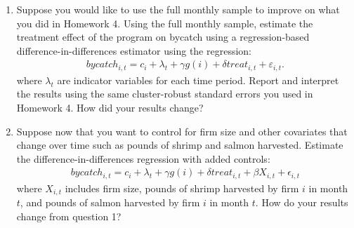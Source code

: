 \documentclass{article}
\begin{document}
\begin{enumerate}
    \item Suppose you would like to use the full monthly sample to improve on what you did in Homework 4.  Using the full monthly sample, estimate the treatment effect of the program on bycatch using a regression-based difference-in-differences estimator using the regression:
    \begin{align}
        bycatch_{i,t} = c_i + \lambda_t + \gamma g(i) + \delta treat_{i,t} + \varepsilon_{i,t}.
    \end{align}
    where \(\lambda_t\) are indicator variables for each time period.  Report and interpret the results using the same cluster-robust standard errors you used in Homework 4.  How did your results change?
    \item Suppose now that you want to control for firm size and other covariates that change over time such as pounds of shrimp and salmon harvested.  Estimate the difference-in-differences regression with added controls:
    \begin{align}
        bycatch_{i,t} = c_i + \lambda_t + \gamma g(i) + \delta treat_{i,t} + \beta X_{i,t} + \epsilon_{i,t}
    \end{align}
    where \(X_{i,t}\) includes firm size, pounds of shrimp harvested by firm \(i\) in month \(t\), and pounds of salmon harvested by firm \(i\) in month \(t\).  How do your results change from question 1?
\end{enumerate}
\end{document}
